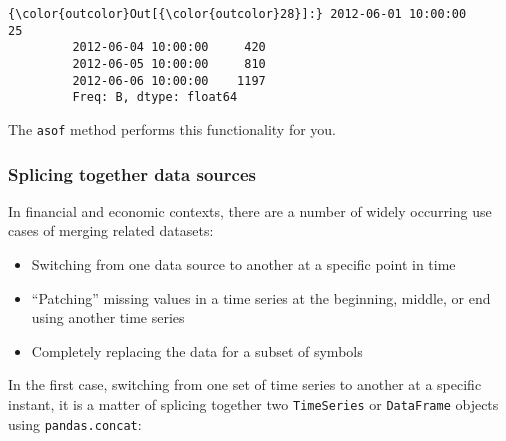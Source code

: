 \documentclass{article}
\begin{document}
            \begin{Verbatim}[commandchars=\\\{\}]
{\color{outcolor}Out[{\color{outcolor}28}]:} 2012-06-01 10:00:00      25
         2012-06-04 10:00:00     420
         2012-06-05 10:00:00     810
         2012-06-06 10:00:00    1197
         Freq: B, dtype: float64
\end{Verbatim}
        
    The \texttt{asof} method performs this functionality for you.

    \subsubsection{Splicing together data
sources}\label{splicing-together-data-sources}

    In financial and economic contexts, there are a number of widely
occurring use cases of merging related datasets:

\begin{itemize}
\itemsep1pt\parskip0pt
\item
  Switching from one data source to another at a specific point in time
\item
  ``Patching'' missing values in a time series at the beginning, middle,
  or end using another time series
\item
  Completely replacing the data for a subset of symbols
\end{itemize}

In the first case, switching from one set of time series to another at a
specific instant, it is a matter of splicing together two
\texttt{TimeSeries} or \texttt{DataFrame} objects using
\texttt{pandas.concat}:
\end{document}
